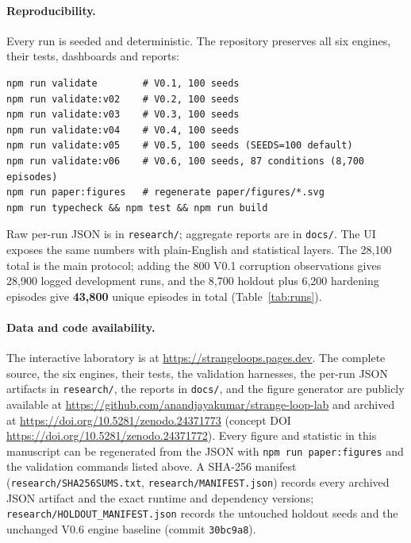 \documentclass[11pt,a4paper]{article}
\begin{document}
\paragraph{Reproducibility.}
Every run is seeded and deterministic. The repository preserves all six engines, their tests, dashboards and reports:
\begin{verbatim}
npm run validate        # V0.1, 100 seeds
npm run validate:v02    # V0.2, 100 seeds
npm run validate:v03    # V0.3, 100 seeds
npm run validate:v04    # V0.4, 100 seeds
npm run validate:v05    # V0.5, 100 seeds (SEEDS=100 default)
npm run validate:v06    # V0.6, 100 seeds, 87 conditions (8,700 episodes)
npm run paper:figures   # regenerate paper/figures/*.svg
npm run typecheck && npm test && npm run build
\end{verbatim}
Raw per-run JSON is in \texttt{research/}; aggregate reports are in \texttt{docs/}. The UI exposes the same numbers with plain-English and statistical layers. The 28{,}100 total is the main protocol; adding the 800 V0.1 corruption observations gives 28{,}900 logged development runs, and the 8{,}700 holdout plus 6{,}200 hardening episodes give \textbf{43{,}800} unique episodes in total (Table~\ref{tab:runs}).

\paragraph{Data and code availability.}
The interactive laboratory is at \url{https://strangeloops.pages.dev}. The complete source, the six engines, their tests, the validation harnesses, the per-run JSON artifacts in \texttt{research/}, the reports in \texttt{docs/}, and the figure generator are publicly available at \url{https://github.com/anandjayakumar/strange-loop-lab} and archived at \url{https://doi.org/10.5281/zenodo.24371773} (concept DOI \url{https://doi.org/10.5281/zenodo.24371772}). Every figure and statistic in this manuscript can be regenerated from the JSON with \texttt{npm run paper:figures} and the validation commands listed above. A SHA-256 manifest (\texttt{research/SHA256SUMS.txt}, \texttt{research/MANIFEST.json}) records every archived JSON artifact and the exact runtime and dependency versions; \texttt{research/HOLDOUT\_MANIFEST.json} records the untouched holdout seeds and the unchanged V0.6 engine baseline (commit \texttt{30bc9a8}).
\end{document}
